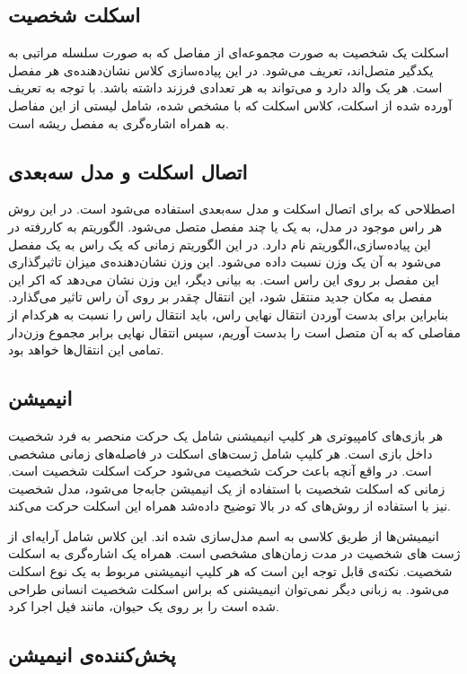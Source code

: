 \subsection{اسکلت شخصیت}

اسکلت یک شخصیت به صورت مجموعه‌ای از مفاصل که به صورت سلسله مراتبی به یکدگیر متصل‌اند، تعریف می‌شود.
در این پیاده‌سازی کلاس 
نشان‌دهنده‌ی هر مفصل است.
هر 
یک والد دارد و می‌تواند به هر تعدادی فرزند داشته باشد.
با توجه به تعریف آورده شده از اسکلت، کلاس اسکلت که با
مشخص شده، شامل لیستی از این مفاصل به همراه اشاره‌گری به مفصل ریشه است.

\subsection{اتصال اسکلت و مدل سه‌بعدی}
اصطلاحی که برای اتصال اسکلت و مدل سه‌بعدی استفاده می‌شود
است.
در این روش هر راس موجود در مدل، به یک یا چند مفصل متصل می‌شود.
الگوریتم به کار‌رفته در این پیاده‌سازی،الگوریتم
نام دارد. در این الگوریتم زمانی که یک راس به یک مفصل می‌شود به آن یک وزن نسبت داده می‌شود.
این وزن نشان‌دهنده‌ی میزان تاثیرگذاری این مفصل بر روی این راس است.
به بیانی دیگر، این وزن نشان می‌دهد که اکر این مفصل به مکان جدید منتقل شود، این انتقال چقدر بر روی آن راس تاثیر می‌گذارد.
بنابراین برای بدست آوردن انتقال نهایی راس، باید انتقال راس را نسبت به هرکدام از مفاصلی که به آن متصل است را بدست آوریم، سپس انتقال نهایی
برابر مجموع وزن‌دار تمامی این انتقال‌ها خواهد بود. 

\subsection{انیمیشن}
هر بازی‌های کامپیوتری هر کلیپ انیمیشنی شامل یک حرکت منحصر به فرد شخصیت داخل بازی است.
هر کلیپ‌ شامل ژست‌های اسکلت در فاصله‌های زمانی مشخصی است. در واقع آنچه باعث حرکت شخصیت می‌شود حرکت اسکلت شخصیت است.
زمانی که اسکلت شخصیت با استفاده از یک انیمیشن جابه‌جا می‌شود، مدل شخصیت نیز با استفاده از روش‌های 
که در بالا توضیح داده‌شد همراه این اسکلت حرکت می‌کند.

انیمیشن‌ها از طریق کلاسی به اسم
مدل‌سازی شده اند. 
این کلاس شامل آرایه‌ای از ژست های شخصیت در مدت زمان‌های مشخصی است. همراه یک اشاره‌گری به اسکلت شخصیت.
نکته‌ی قابل توجه این است که هر کلیپ انیمیشنی مربوط به یک نوع اسکلت می‌شود. به زبانی دیگر نمی‌توان انیمیشنی که براس اسکلت
شخصیت انسانی طراحی شده است را بر روی یک حیوان، مانند فیل اجرا کرد.

\subsection{پخش‌کننده‌ی انیمیشن}

